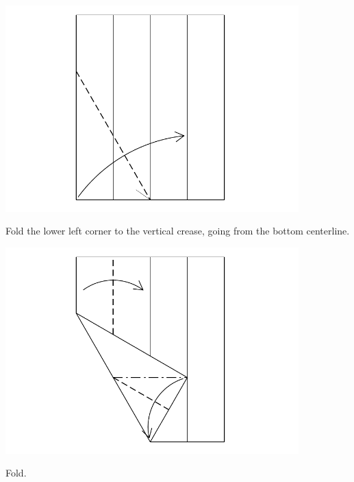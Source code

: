 \documentclass[11pt]{article}
\begin{document}
\begin{minipage}[t]{0.45\textwidth}
  \includegraphics[width=0.85\textwidth]{../figs/fig03-06}
  \begin{itemize}{\item[6.] Fold the lower left corner to the  vertical crease, going from the bottom centerline.}\end{itemize}
\end{minipage}
\hfill
\begin{minipage}[t]{0.45\textwidth}
  \includegraphics[width=0.85\textwidth]{../figs/fig03-07}
  \begin{itemize}{\item[7.] Fold.}\end{itemize}
\end{minipage}

\vspace*{0.5in}
\end{document}
